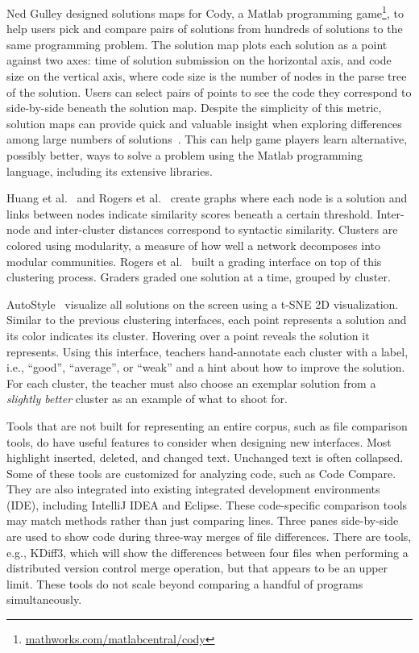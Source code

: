 
Ned Gulley designed solutions maps for Cody, a Matlab programming game\footnote{\url{mathworks.com/matlabcentral/cody}}, to help users pick and compare pairs of solutions from hundreds of solutions to the same programming problem. The solution map plots each solution as a point against two axes: time of solution submission on the horizontal axis, and code size on the vertical axis, where code size is the number of nodes in the parse tree of the solution. Users can select pairs of points to see the code they correspond to side-by-side beneath the solution map. Despite the simplicity of this metric, solution maps can provide quick and valuable insight when exploring differences among large numbers of solutions~\cite{ICERGlassman}. This can help game players learn alternative, possibly better, ways to solve a problem using the Matlab programming language, including its extensive libraries.

Huang et al.~\cite{MOOCshop} and Rogers et al.~\cite{ACESthesis} create graphs where each node is a solution and links between nodes indicate similarity scores beneath a certain threshold. Inter-node and inter-cluster distances correspond to syntactic similarity. Clusters are colored using modularity, a measure of how well a network decomposes into modular communities. Rogers et al.~\cite{ACESthesis} built a grading interface on top of this clustering process. Graders graded one solution at a time, grouped by cluster.

AutoStyle~\cite{choudhury2016autostyle} visualize all solutions on the screen using a t-SNE 2D visualization. Similar to the previous clustering interfaces, each point represents a solution and its color indicates its cluster. Hovering over a point reveals the solution it represents. Using this interface, teachers hand-annotate each cluster with a label, i.e., ``good'', ``average'', or ``weak'' and a hint about how to improve the solution. For each cluster, the teacher must also choose an exemplar solution from a {\it slightly better} cluster as an example of what to shoot for.

Tools that are not built for representing an entire corpus, such as file comparison tools, do have useful features to consider when designing new interfaces. Most highlight inserted, deleted, and changed text. Unchanged text is often collapsed. Some of these tools are customized for analyzing code, such as Code Compare. They are also integrated into existing integrated development environments (IDE), including IntelliJ IDEA and Eclipse. These code-specific comparison tools may match methods rather than just comparing lines. Three panes side-by-side are used to show code during three-way merges of file differences. There are tools, e.g., KDiff3, which will show the differences between four files when performing a distributed version control merge operation, but that appears to be an upper limit. These tools do not scale beyond comparing a handful of programs simultaneously.

